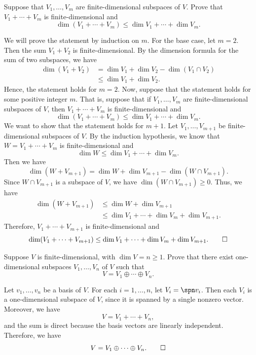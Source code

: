 \begin{exercise}
Suppose that $V_1,\dots,V_m$ are finite-dimensional subspaces of $V$. Prove that
$V_1+\cdots+V_m$ is finite-dimensional and
\[ \dim(V_1+\cdots+V_m) \le \dim V_1+\cdots+\dim V_m. \]
\end{exercise}
\begin{solution}
We will prove the statement by induction on $m$. For the base case, let $m=2$.
Then the sum $V_1+V_2$ is finite-dimensional. By the dimension formula for the
sum of two subspaces, we have
\begin{align*}
\dim(V_1+V_2) &= \dim V_1+\dim V_2-\dim(V_1\cap V_2)\\
  &\le \dim V_1+\dim V_2.
\end{align*}
Hence, the statement holds for $m=2$. Now, suppose that the statement holds for
some positive integer $m$. That is, suppose that if $V_1,\dots,V_m$ are
finite-dimensional subspaces of $V$, then $V_1+\cdots+V_m$ is finite-dimensional
and
\[ \dim(V_1+\cdots+V_m) \le \dim V_1+\cdots+\dim V_m. \]
We want to show that the statement holds for $m+1$. Let $V_1,\dots,V_{m+1}$ be
finite-dimensional subspaces of $V$. By the induction hypothesis, we know that
$W=V_1+\cdots+V_m$ is finite-dimensional and
\[ \dim W \le \dim V_1+\cdots+\dim V_m. \]
Then we have
\[ \dim(W+V_{m+1}) = \dim W+\dim V_{m+1}-\dim(W\cap V_{m+1}). \]
Since $W\cap V_{m+1}$ is a subspace of $V$, we have $\dim(W\cap V_{m+1})\ge0$.
Thus, we have
\begin{align*}
\dim(W+V_{m+1}) &\le \dim W+\dim V_{m+1}\\
  &\le \dim V_1+\cdots+\dim V_m+\dim V_{m+1}.
\end{align*}
Therefore, $V_1+\cdots+V_{m+1}$ is finite-dimensional and
\[ \dim(V_1+\cdots+V_{m+1}) \le \dim V_1+\cdots+\dim V_m+\dim V_{m+1}.
   \qedhere \]
\end{solution}

\begin{exercise}
Suppose $V$ is finite-dimensional, with $\dim V=n\ge1$. Prove that there exist
one-dimensional subspaces $V_1,\dots,V_n$ of $V$ such that
\[ V = V_1\oplus\cdots\oplus V_n. \]
\end{exercise}
\begin{solution}
Let $v_1,\dots,v_n$ be a basis of $V$. For each $i=1,\dots,n$, let
$V_i=\spn v_i$. Then each $V_i$ is a one-dimensional subspace of $V$, since it
is spanned by a single nonzero vector. Moreover, we have
\[ V = V_1+\cdots+V_n, \]
and the sum is direct because the basis vectors are linearly independent.
Therefore, we have
\[ V = V_1\oplus\cdots\oplus V_n. \qedhere \]
\end{solution}

